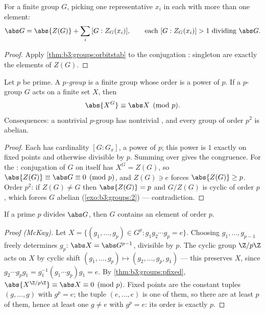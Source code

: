 \begin{corollary}\label{cor:b3:groups:classeq}
For a finite group $G$, picking one representative $x_i$ in each
 with more than one element:
\[
\abs G = \abs{Z(G)} + \sum_i \,[G : Z_G(x_i)],
\qquad\text{each } [G : Z_G(x_i)] > 1 \text{ dividing } \abs G.
\]
\end{corollary}

\begin{proof}
Apply \cref{thm:b3:groups:orbitstab} to the conjugation :
singleton  are exactly the elements of $Z(G)$.
\end{proof}

\begin{theorem}\label{thm:b3:groups:pfixed}
Let $p$ be prime. A \emph{$p$-group} is a
finite group whose order is a power of $p$. If a $p$-group $G$ acts
on a finite set $X$, then
\[
\abs{X^G} \equiv \abs X \pmod p .
\]
Consequences: a nontrivial $p$-group has nontrivial , and
every group of order $p^2$ is abelian.
\end{theorem}

\begin{proof}
Each  has cardinality $[G:G_x]$, a power of $p$; this power is
$1$ exactly on fixed points and otherwise divisible by $p$. Summing
over  gives the congruence. For the : conjugation
 of $G$ on itself has $X^G = Z(G)$, so $\abs{Z(G)} \equiv
\abs G \equiv 0 \pmod p$, and $Z(G) \ni e$ forces $\abs{Z(G)} \geq
p$. Order $p^2$: if $Z(G) \neq G$ then $\abs{Z(G)} = p$ and
$G/Z(G)$ is cyclic of order $p$, which forces $G$ abelian
(\cref{exo:b3:groups:2}) --- contradiction.
\end{proof}

\begin{theorem}[Cauchy]\label{thm:b3:groups:cauchy}
If a prime $p$ divides $\abs G$, then $G$ contains an element of
order $p$.
\end{theorem}

\begin{proof}[Proof (McKay)]
Let $X = \{(g_1, \dots, g_p) \in G^p : g_1 g_2 \cdots g_p = e\}$.
Choosing $g_1, \dots, g_{p-1}$ freely determines $g_p$: $\abs X =
\abs G^{p-1}$, divisible by $p$. The cyclic group $\Z/p\Z$ acts on
$X$ by cyclic shift $(g_1, \dots, g_p) \mapsto (g_2, \dots, g_p,
g_1)$ --- this preserves $X$, since $g_2 \cdots g_p g_1 =
g_1^{-1}(g_1 \cdots g_p)g_1 = e$. By \cref{thm:b3:groups:pfixed},
$\abs{X^{\Z/p\Z}} \equiv \abs X \equiv 0 \pmod p$. Fixed points are
the constant tuples $(g, \dots, g)$ with $g^p = e$; the tuple $(e,
\dots, e)$ is one of them, so there are at least $p$ of them, hence
at least one $g \neq e$ with $g^p = e$: its order is exactly $p$.
\end{proof}

